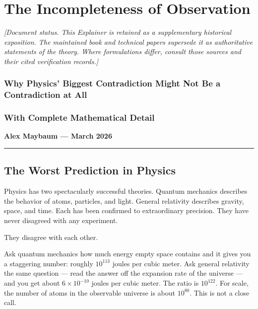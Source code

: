 \documentclass[
]{article}
\author{}
\date{}
\begin{document}
\hypertarget{the-incompleteness-of-observation}{%
\section{The Incompleteness of
Observation}\label{the-incompleteness-of-observation}}

\emph{{[}Document status. This Explainer is retained as a supplementary
historical exposition. The maintained book and technical papers
supersede it as authoritative statements of the theory. Where
formulations differ, consult those sources and their cited verification
records.{]}}

\hypertarget{why-physics-biggest-contradiction-might-not-be-a-contradiction-at-all}{%
\subsubsection{Why Physics' Biggest Contradiction Might Not Be a
Contradiction at
All}\label{why-physics-biggest-contradiction-might-not-be-a-contradiction-at-all}}

\hypertarget{with-complete-mathematical-detail}{%
\subsubsection{With Complete Mathematical
Detail}\label{with-complete-mathematical-detail}}

\textbf{Alex Maybaum --- March 2026}

\begin{center}\rule{0.5\linewidth}{0.5pt}\end{center}

\hypertarget{the-worst-prediction-in-physics}{%
\subsection{The Worst Prediction in
Physics}\label{the-worst-prediction-in-physics}}

Physics has two spectacularly successful theories. Quantum mechanics
describes the behavior of atoms, particles, and light. General
relativity describes gravity, space, and time. Each has been confirmed
to extraordinary precision. They have never disagreed with any
experiment.

They disagree with each other.

Ask quantum mechanics how much energy empty space contains and it gives
you a staggering number: roughly \(10^{113}\) joules per cubic meter.
Ask general relativity the same question --- read the answer off the
expansion rate of the universe --- and you get about
\(6 \times 10^{-10}\) joules per cubic meter. The ratio is \(10^{122}\).
For scale, the number of atoms in the observable universe is about
\(10^{80}\). This is not a close call.
\end{document}
